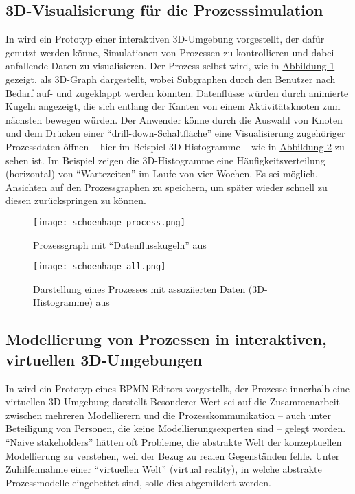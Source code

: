 \documentclass[a4paper,10pt]{sphinxmanual}
\begin{document}
\subsection{3D-Visualisierung für die Prozesssimulation}
\label{related:d-visualisierung-fur-die-prozesssimulation}\label{related:schoenhage}
In \cite{schonhage_3d_2000} wird ein Prototyp einer interaktiven 3D-Umgebung vorgestellt, der dafür genutzt werden könne, Simulationen von Prozessen zu kontrollieren und dabei anfallende Daten zu visualisieren.
Der Prozess selbst wird, wie in \hyperref[related:schoenhage-graph]{Abbildung  \ref*{related:schoenhage-graph}} gezeigt, als 3D-Graph dargestellt, wobei Subgraphen durch den Benutzer nach Bedarf auf- und zugeklappt werden könnten.
Datenflüsse würden durch animierte Kugeln angezeigt, die sich entlang der Kanten von einem Aktivitätsknoten zum nächsten bewegen würden.
Der Anwender könne durch die Auswahl von Knoten und dem Drücken einer "`drill-down-Schaltfläche"' eine Visualisierung zugehöriger Prozessdaten öffnen – hier im Beispiel 3D-Histogramme – wie in \hyperref[related:schoenhage-all]{Abbildung  \ref*{related:schoenhage-all}} zu sehen ist. Im Beispiel zeigen die 3D-Histogramme eine Häufigkeitsverteilung (horizontal) von "`Wartezeiten"' im Laufe von vier Wochen.
Es sei möglich, Ansichten auf den Prozessgraphen zu speichern, um später wieder schnell zu diesen zurückspringen zu können.
\begin{figure}[htbp]
\centering
\capstart

\texttt{[image: schoenhage\_process.png]}
\caption{Prozessgraph mit "`Datenflusskugeln"' aus \cite{schonhage_3d_2000}}\label{related:schoenhage-graph}\end{figure}
\begin{figure}[htbp]
\centering
\capstart

\texttt{[image: schoenhage\_all.png]}
\caption{Darstellung eines Prozesses mit assoziierten Daten (3D-Histogramme) aus \cite{schonhage_3d_2000}}\label{related:schoenhage-all}\end{figure}


\subsection{Modellierung von Prozessen in interaktiven, virtuellen 3D-Umgebungen}
\label{related:ross-brown}\label{related:modellierung-von-prozessen-in-interaktiven-virtuellen-3d-umgebungen}
In \cite{brown_conceptual_2010} wird ein Prototyp eines BPMN-Editors vorgestellt, der Prozesse innerhalb eine virtuellen 3D-Umgebung darstellt
Besonderer Wert sei auf die Zusammenarbeit zwischen mehreren Modellierern und die Prozesskommunikation – auch unter Beteiligung von Personen, die keine Modellierungsexperten sind – gelegt worden.
"`Naive stakeholders"' hätten oft Probleme, die abstrakte Welt der konzeptuellen Modellierung zu verstehen, weil der Bezug zu realen Gegenständen fehle.
Unter Zuhilfennahme einer "`virtuellen Welt"' (virtual reality), in welche abstrakte Prozessmodelle eingebettet sind, solle dies abgemildert werden.
\end{document}
